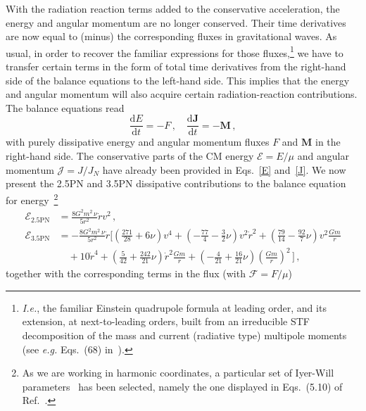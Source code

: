 \documentclass[prd,preprint,superscriptaddress,tightenlines,nofootinbib,
  eqsecnum,showpacs]{revtex4}
\newcommand{\ud}{\mathrm{d}}
\begin{document}
With the radiation reaction terms added to the conservative acceleration, the
energy and angular momentum are no longer conserved. Their time derivatives
are now equal to (minus) the corresponding fluxes in gravitational
waves. As usual, in order to recover the familiar expressions for those
fluxes,\footnote{\textit{I.e.}, the familiar Einstein quadrupole formula at
  leading order, and its extension, at next-to-leading orders, built from an
  irreducible STF decomposition of the mass and current (radiative type)
  multipole moments (see \textit{e.g.} Eqs.~(68) in~\cite{Bliving14}).} we have
to transfer certain terms in the form of total time derivatives from the
right-hand side of the balance equations to the left-hand side. This implies
that the energy and angular momentum will also acquire certain
radiation-reaction contributions. The balance equations read
%
\begin{equation}\label{balance}
\frac{\ud E}{\ud t} = - F \,,\quad \frac{\ud \bm{J}}{\ud t}= - \bm{M} \,,
\end{equation} 
%
with purely dissipative energy and angular momentum fluxes $F$ and $\bm{M}$ in
the right-hand side. The conservative parts of the CM energy
$\mathcal{E}=E/\mu$ and angular momentum $\mathcal{J}=J/J_N$ have already been
provided in Eqs.~\eqref{E} and~\eqref{J}. We now present the 2.5PN and 3.5PN dissipative
contributions to the balance equation for energy~\cite{IW93,
  IW95, PW02, KFS03, NB05, itoh3}\footnote{As we are working in harmonic
  coordinates, a particular set of Iyer-Will parameters~\cite{IW93, IW95} has
  been selected, namely the one displayed in Eqs.~(5.10) of Ref.~\cite{NB05}.}
%
\begin{subequations}\label{Ediss}
\begin{align}
\mathcal{E}_\text{2.5PN} &= \frac{8 G^2 m^2\,\nu}{5r^2}\dot{r}v^2\,,\\
\mathcal{E}_\text{3.5PN} &= - \frac{8 G^2 m^2\,\nu}{5r^2}
\dot{r}\biggl[ \left(\frac{271}{28}+6\nu\right)v^4 
+ \left(-\frac{77}{4}-\frac{3}{2}\nu\right)v^2\dot{r}^2 
+ \left(\frac{79}{14}-\frac{92}{7}\nu\right)v^2\frac{G m}{r} \nonumber\\ 
&\quad  + 10 \dot{r}^4 + \left(\frac{5}{42}+\frac{242}{21}\nu\right) 
\dot{r}^2\frac{G m}{r} + \left(-\frac{4}{21}+\frac{16}{21}\nu\right) 
\left(\frac{G m}{r}\right)^2\,\biggr]\,,
\end{align}\end{subequations}
%
together with the corresponding terms in the flux (with $\mathcal{F}=F/\mu$)
\end{document}
